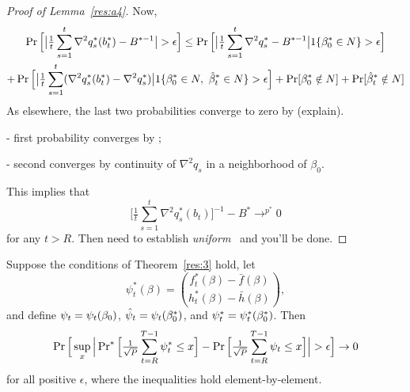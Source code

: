 \documentclass[12pt,fleqn]{article}
\begin{document}
\begin{proof}[Proof of Lemma~\ref{res:a4}]
Now,
\begin{multline*}
  \operatorname{Pr}\Big[\big\lvert \tfrac{1}{t} \sum_{s=1}^t \nabla^2 q_s^*(b_t^*) - B^{*-1} \big\rvert > \epsilon \Big]
  \leq
  \operatorname{Pr}\Big[\big\lvert \tfrac{1}{t} \sum_{s=1}^t \nabla^2 q_s^* - B^{*-1} \big\rvert 1\{\beta_0^* \in N\}> \epsilon \Big] \\
  + \operatorname{Pr}\Big[\big\lvert \tfrac{1}{t} \sum_{s=1}^t (\nabla^2 q_s^*(b_t^*) - \nabla^2 q_s^*) \big\rvert
  1\{\beta_0^* \in N,\ \hat \beta_t^* \in N\} > \epsilon \Big] + \operatorname{Pr}[\beta_0^* \notin N] + \operatorname{Pr}[\hat \beta_t^* \notin N]
\end{multline*}
As elsewhere, the last two probabilities converge to zero by (explain).

- first probability converges by \lln;

- second converges by continuity of $\nabla^2 q_s$ in a neighborhood of $\beta_0$.

This implies that
\begin{equation*}
  \Big[\tfrac{1}{t} \sum_{s=1}^t \nabla^2 q_s^*(b_t)\Big]^{-1} - B^* \to^{p^*} 0
\end{equation*}
for any $t > R$. Then need to establish \emph{uniform} \lln\ and you'll be done.
\end{proof}

\begin{lema}\label{res:a3}
  Suppose the conditions of Theorem~\ref{res:3} hold, let
  \[\psi_t^{*}(\beta) =
  \binom{f_t^{*}(\beta) - \bar{f}(\beta)}{h_t^{*}(\beta) - \bar h(\beta)},\]
  and define $\psi_t = \psi_t(\beta_0)$, $\hat\psi_t = \psi_t(\beta_0^*)$, and
  $\psi_t^* = \psi_t^*(\beta_0^*)$.  Then
  \begin{equation}\label{eq:1}
    \operatorname{Pr}\Big[\sup_x \Big| \operatorname{Pr}^{*}\Big[ \tfrac{1}{\sqrt{P}} \sum_{t=R}^{T-1} \psi_{t}^{*}
    \leq x \Big] - \operatorname{Pr}\Big[ \tfrac{1}{\sqrt{P}} \sum_{t=R}^{T-1} \psi_{t}
    \leq x \Big] \Big| > \epsilon \Big] \to 0
  \end{equation}
  for all positive $\epsilon$, where the inequalities hold element-by-element.
\end{lema}
\end{document}
